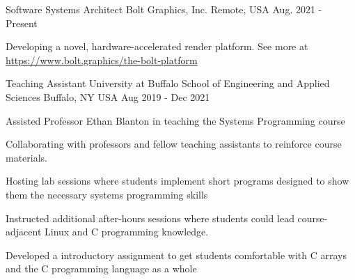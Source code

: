 

\begin{cventries}
  \cventry
    {Software Systems Architect} %
    {Bolt Graphics, Inc.} %
    {Remote, USA} %
    {Aug. 2021 - Present} %
    {
      \begin{cvitems} %
        \item {Developing a novel, hardware-accelerated render platform. See more at \url{https://www.bolt.graphics/the-bolt-platform}}
      \end{cvitems}
    }
    

  \cventry
    {Teaching Assistant} %
    {University at Buffalo School of Engineering and Applied Sciences} %
    {Buffalo, NY USA} %
    {Aug 2019 - Dec 2021} %
    {
      \begin{cvitems} %
        \item Assisted Professor Ethan Blanton in teaching the Systems Programming course
        \item Collaborating with professors and fellow teaching assistants to reinforce course materials.
        \item Hosting lab sessions where students implement short programs designed to show them the necessary systems programming skills
        \item Instructed additional after-hours sessions where students could lead course-adjacent Linux and C programming knowledge.
        \item Developed a introductory assignment to get students comfortable with C arrays and the C programming language as a whole
      \end{cvitems}
    }



\end{cventries}
